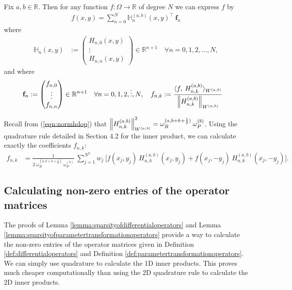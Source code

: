 \documentclass[11pt, oneside]{article}   	%
\newcommand{\half}{\frac{1}{2}}
\newcommand{\R}{\mathbb{R}}
\newcommand{\hdop}{H}
\newcommand{\bighdop}{\mathbb{\hdop}}
\newcommand{\hdopnk}{\hdop_{n,k}}
\newcommand{\hdopnkab}{\hdop_{n,k}^{(a,b)}}
\newcommand{\Wab}{{W^{(a,b)}}}
\newcommand{\genjac}{R}
\newcommand{\normgenjac}{\omega_\genjac}
\newcommand{\normjac}{\omega_P}
\begin{document}
Fix \(a,b \in \R\). Then for any function \(f : \Omega \to \R\) of degree $N$ we can express \(f\) by
\begin{align*}
f(x,y) = \sum_{n=0}^N \bighdop_n^{(a,b)}(x,y)^\top \: \mathbf{f}_n
\end{align*}
where
\begin{align*}
\bighdop_n(x,y) &:= \begin{pmatrix}
		\hdop_{n,0}(x,y) \\
		\vdots \\
		\hdop_{n,n}(x,y)
	\end{pmatrix} \in \R^{n+1} \quad \forall n = 0,1,2,\dots,N,
\end{align*}
and where
\begin{align*}
\mathbf{f}_n &:= \begin{pmatrix}
		f_{n,0} \\
		\vdots \\
		f_{n,n}
	\end{pmatrix} \in \R^{n+1} \quad \forall n = 0,1,2,\dots,N, \quad
f_{n,k} := \frac{\langle f, \: \hdopnk^{(a,b)} \rangle_{W^{(a,b)}}}{\norm{\hdopnk^{(a,b)}}_{W^{(a,b)}}}
\end{align*}

Recall from (\ref{eqn:normhdop}) that $\norm{\hdopnkab}^2_\Wab = \normgenjac^{(a,b+k+\half)} \: \normjac^{(b)}$. Using the quadrature rule detailed in Section 4.2 for the inner product, we can calculate exactly the coefficients $f_{n,k}$: 
\begin{align*}
	f_{n,k} &= \frac{1}{2 \: \normgenjac^{(a,b+k+\half)} \: \normjac^{(b)}} \: \sum_{j=1}^{N^2} w_j \: \big[ f(x_j, y_j) \: \hdopnk^{(a,b)}(x_j, y_j) +f(x_j, -y_j) \: \hdopnk^{(a,b)}(x_j, -y_j) \big].
\end{align*}


\subsection{Calculating non-zero entries of the operator matrices}\label{subsection:Computation-operatormatrices}

The proofs of Lemma \ref{lemma:sparsityofdifferentialoperators} and Lemma \ref{lemma:sparsityofparametertransformationoperators} provide a way to calculate the non-zero entries of the operator matrices given in Definition \ref{def:differentialoperators} and Definition \ref{def:parametertransformationoperators}. We can simply use quadrature to calculate the 1D inner products. This proves much cheaper computationally than using the 2D quadrature rule to calculate the 2D inner products.
\end{document}
